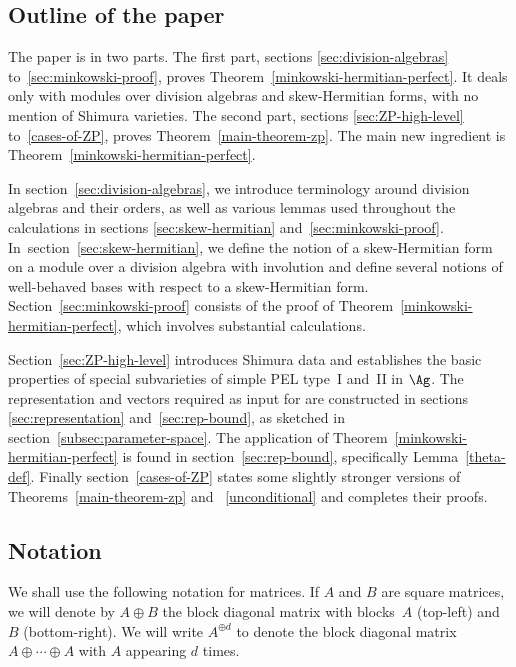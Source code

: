\subsection{Outline of the paper}

The paper is in two parts.
The first part, sections \ref{sec:division-algebras} to~\ref{sec:minkowski-proof}, proves Theorem~\ref{minkowski-hermitian-perfect}. It deals only with modules over division algebras and skew-Hermitian forms, with no mention of Shimura varieties.
The second part, sections \ref{sec:ZP-high-level} to~\ref{cases-of-ZP}, proves Theorem~\ref{main-theorem-zp}. The main new ingredient is Theorem~\ref{minkowski-hermitian-perfect}.

In section~\ref{sec:division-algebras}, we introduce terminology around division algebras and their orders, as well as various lemmas used throughout the calculations in sections \ref{sec:skew-hermitian} and~\ref{sec:minkowski-proof}.
In~section~\ref{sec:skew-hermitian}, we define the notion of a skew-Hermitian form on a module over a division algebra with involution and define several notions of well-behaved bases with respect to a skew-Hermitian form.
Section~\ref{sec:minkowski-proof} consists of the proof of Theorem~\ref{minkowski-hermitian-perfect}, which involves substantial calculations.

Section~\ref{sec:ZP-high-level} introduces Shimura data and establishes the basic properties of special subvarieties of simple PEL type~I and~II in $\Ag$.
The representation and vectors \hbox{required} as input for \cite[Th.\,1.2]{QRTUI} are constructed in sections \ref{sec:representation} and~\ref{sec:rep-bound}, as sketched in section~\ref{subsec:parameter-space}. The application of Theorem~\ref{minkowski-hermitian-perfect} is found in section~\ref{sec:rep-bound}, specifically Lemma~\ref{theta-def}. Finally section~\ref{cases-of-ZP} states some slightly stronger versions of Theorems~\ref{main-theorem-zp} and~ \ref{unconditional} and completes their proofs.

\subsection{Notation} \label{subsec:notation}

We shall use the following notation for matrices.
If $A$ and $B$ are square matrices, we will denote by $A\oplus B$ the block diagonal matrix with blocks~$A$ (top-left) and $B$ (bottom-right). We will write $A^{\oplus d}$ to denote the block diagonal matrix $A\oplus\cdots\oplus A$ with $A$ appearing $d$ times.

